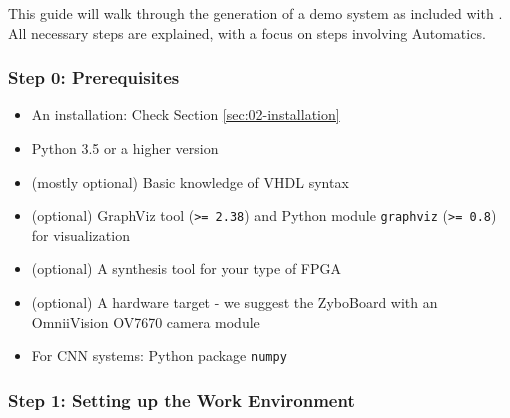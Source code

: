 This guide will walk through the generation of a demo system as included with \asterics.
All necessary steps are explained, with a focus on steps involving Automatics.


\subsubsection{Step 0: Prerequisites}

\begin{itemize}
\item An \asterics installation: Check Section \ref{sec:02-installation}
\item Python 3.5 or a higher version
\item (mostly optional) Basic knowledge of VHDL syntax
\item (optional) GraphViz tool (\texttt{>= 2.38}) and Python module \texttt{graphviz} (\texttt{>= 0.8}) for visualization 
\item (optional) A synthesis tool for your type of FPGA
\item (optional) A hardware target - we suggest the ZyboBoard with an OmniiVision OV7670 camera module 
\item For CNN systems: Python package \texttt{numpy}
\end{itemize}


\subsubsection{Step 1: Setting up the Work Environment}

